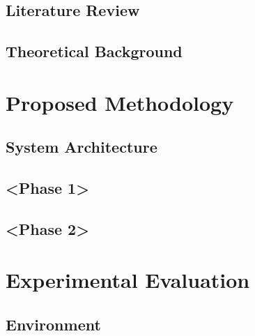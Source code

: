 \documentclass[a4paper, 11pt]{article}
\begin{document}
\subsection{Literature Review}

\subsection{Theoretical Background}

\newpage
\section{Proposed Methodology}

\subsection{System Architecture}

\subsection{<Phase 1>}

\subsection{<Phase 2>}

\newpage
\section{Experimental Evaluation}

\subsection{Environment}
\end{document}
